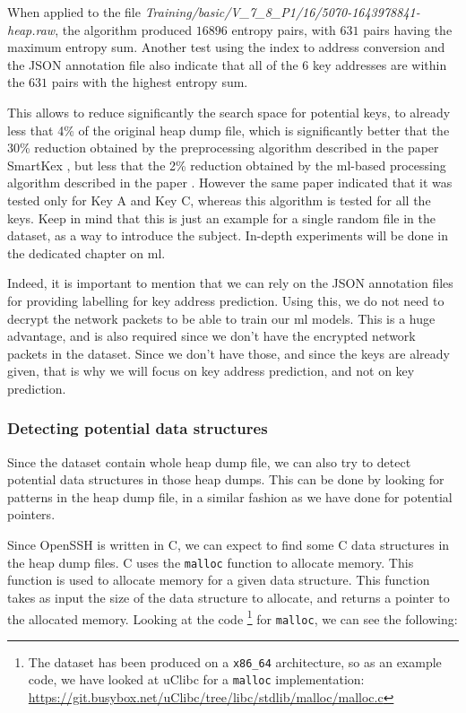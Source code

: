     When applied to the file \textit{Training/basic/V\_7\_8\_P1/16/5070-1643978841-heap.raw}, the algorithm produced $ 16896 $ entropy pairs, with $ 631 $ pairs having the maximum entropy sum. Another test using the index to address conversion and the JSON annotation file also indicate that all of the 6 key addresses are within the $ 631 $ pairs with the highest entropy sum.
    
    This allows to reduce significantly the search space for potential keys, to already less that 4\% of the original heap dump file, which is significantly better that the 30\% reduction obtained by the preprocessing algorithm described in the paper SmartKex \cite{SmartKex22}, but less that the 2\% reduction obtained by the \acrshort{ml}-based processing algorithm described in the paper \cite{SmartKex22}. However the same paper indicated that it was tested only for Key A and Key C, whereas this algorithm is tested for all the keys. Keep in mind that this is just an example for a single random file in the dataset, as a way to introduce the subject. In-depth experiments will be done in the dedicated chapter on \acrlong{ml}.

    Indeed, it is important to mention that we can rely on the JSON annotation files for providing labelling for key address prediction. Using this, we do not need to decrypt the network packets to be able to train our \acrshort{ml} models. This is a huge advantage, and is also required since we don't have the encrypted network packets in the dataset. Since we don't have those, and since the keys are already given, that is why we will focus on key address prediction, and not on key prediction.

    \subsubsection{Detecting potential data structures}
    Since the dataset contain whole heap dump file, we can also try to detect potential data structures in those heap dumps. This can be done by looking for patterns in the heap dump file, in a similar fashion as we have done for potential pointers.
    
    Since OpenSSH is written in C, we can expect to find some C data structures in the heap dump files. C uses the \lstinline[language=c]|malloc| function to allocate memory. This function is used to allocate memory for a given data structure. This function takes as input the size of the data structure to allocate, and returns a pointer to the allocated memory. Looking at the code \footnote{The dataset has been produced on a \texttt{x86\_64} architecture, so as an example code, we have looked at uClibc for a \lstinline[language=c]|malloc| implementation: \url{https://git.busybox.net/uClibc/tree/libc/stdlib/malloc/malloc.c} } for \lstinline[language=c]|malloc|, we can see the following:
    
